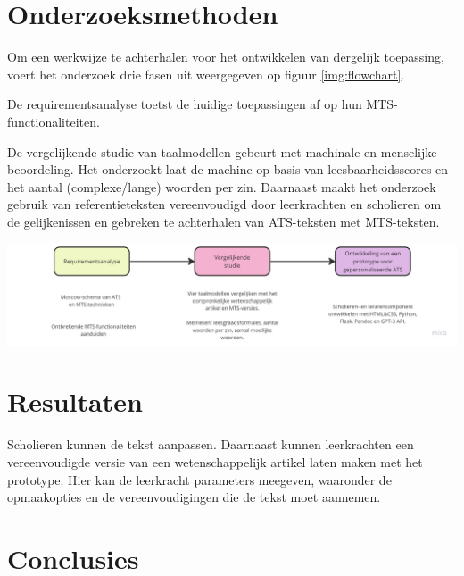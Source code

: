 \documentclass[a0,portrait]{hogent-poster}
\begin{document}
\begin{multicols}{2}
\section{Onderzoeksmethoden}

Om een werkwijze te achterhalen voor het ontwikkelen van dergelijk toepassing, voert het onderzoek drie fasen uit weergegeven op figuur \ref{img:flowchart}. 

De requirementsanalyse toetst de huidige toepassingen af op hun MTS-functionaliteiten. 

De vergelijkende studie van taalmodellen gebeurt met machinale en menselijke beoordeling. Het onderzoekt laat de machine op basis van leesbaarheidsscores en het aantal (complexe/lange) woorden per zin. Daarnaast maakt het onderzoek gebruik van referentieteksten vereenvoudigd door leerkrachten en scholieren om de gelijkenissen en gebreken te achterhalen van ATS-teksten met MTS-teksten.



\begin{center}
	\captionsetup{type=figure}
	\includegraphics[width=1.0\linewidth]{figures/onderzoeksmethoden.jpg}
	\label{img:flowchart}
\end{center}

\section{Resultaten}

Scholieren kunnen de tekst aanpassen. Daarnaast kunnen leerkrachten een vereenvoudigde versie van een wetenschappelijk artikel laten maken met het prototype. Hier kan de leerkracht parameters meegeven, waaronder de opmaakopties en de vereenvoudigingen die de tekst moet aannemen.

\section{Conclusies}


\end{multicols}
\end{document}

